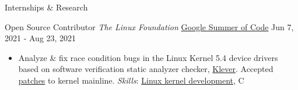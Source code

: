 \documentclass[]{mcdowellcv}
\begin{document}
\begin{cvsection}{Internships \& Research}
  \begin{cvsubsection}
    {Open Source Contributor \linebreak \textit{The Linux Foundation}}
    {\href{https://summerofcode.withgoogle.com/archive/2021/projects/4818588170452992}{Google Summer of Code}}
    {Jun 7, 2021 - Aug 23, 2021}
    \begin{itemize}
      \item
            Analyze \& fix race condition bugs in the Linux Kernel 5.4 device
            drivers based on software verification static analyzer checker,
            \href{https://forge.ispras.ru/projects/klever}{Klever}. Accepted
            \href{https://lore.kernel.org/lkml/?q=saubhik}{patches} to kernel
            mainline. \textit{Skills}: \href{https://www.kernel.org/}{Linux
            kernel development}, C
    \end{itemize}
  \end{cvsubsection}
\end{cvsection}
\end{document}
